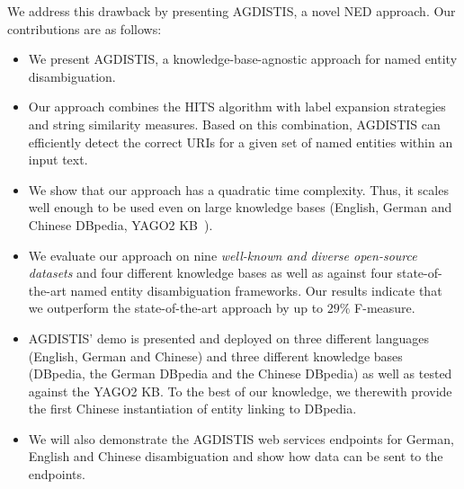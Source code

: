We address this drawback by presenting AGDISTIS,  a novel \ac{NED} approach. Our contributions are as follows:
\begin{itemize}
\item We present AGDISTIS, a knowledge-base-agnostic approach for named entity disambiguation.
\item Our approach combines the \ac{HITS} algorithm with label expansion strategies and string similarity measures.
Based on this combination, AGDISTIS can efficiently detect the correct URIs for a given set of named entities within an input text. 
\item We show that our approach has a quadratic time complexity. Thus, it scales well enough to be used even on large knowledge bases (English, German and Chinese DBpedia, YAGO2 \ac{KB}~\cite{Yago2}).
\item We evaluate our approach on nine \emph{well-known and diverse open-source datasets} and four different knowledge bases as well as against four state-of-the-art named entity disambiguation frameworks.
Our results indicate that we outperform the state-of-the-art approach by up to $29\%$ F-measure.
\item AGDISTIS' demo is presented and deployed on three different languages (English, German and Chinese) and three different knowledge bases (DBpedia, the German DBpedia and the Chinese DBpedia) as well as tested against the YAGO2 \ac{KB}.
To the best of our knowledge, we therewith provide the first Chinese instantiation of entity linking to DBpedia.
\item We will also demonstrate the AGDISTIS web services endpoints for German, English and Chinese disambiguation and show how data can be sent to the endpoints.
\end{itemize}


